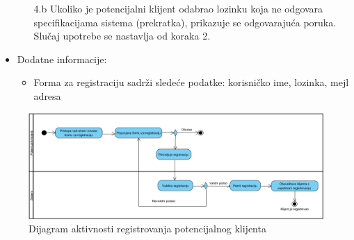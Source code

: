 \begin{itemize}
\begin{itemize}
            \item[4.b] Ukoliko je potencijalni klijent odabrao lozinku koja ne odgovara specifikacijama sistema (prekratka), prikazuje se odgovarajuća poruka. Slučaj upotrebe se nastavlja od koraka 2.
        \end{itemize}
    \item Dodatne informacije:
    \begin{itemize}
        \item Forma za registraciju sadrži sledeće podatke: korisničko ime, lozinka, mejl adresa
    \end{itemize}
\end{itemize}

\begin{figure}[H]
\begin{center}
\includegraphics[width=\textwidth]{Pictures/activity_client_registration.png}
\end{center}
    \caption{Dijagram aktivnosti registrovanja potencijalnog klijenta}
\label{fig:ActivityClientRegistration}
\end{figure}
